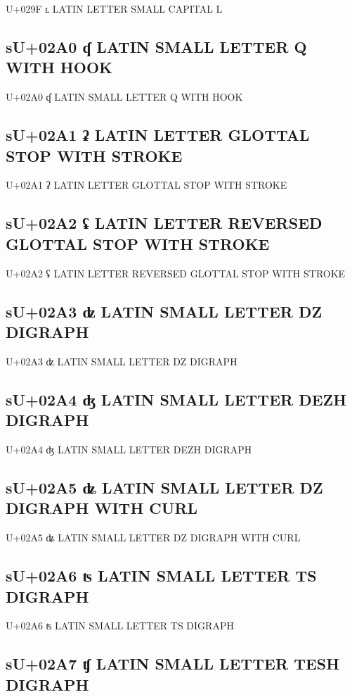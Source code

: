 U+029F ʟ LATIN LETTER SMALL CAPITAL L

\subsection{sU+02A0 ʠ LATIN SMALL LETTER Q WITH HOOK}

U+02A0 ʠ LATIN SMALL LETTER Q WITH HOOK

\subsection{sU+02A1 ʡ LATIN LETTER GLOTTAL STOP WITH STROKE}

U+02A1 ʡ LATIN LETTER GLOTTAL STOP WITH STROKE

\subsection{sU+02A2 ʢ LATIN LETTER REVERSED GLOTTAL STOP WITH STROKE}

U+02A2 ʢ LATIN LETTER REVERSED GLOTTAL STOP WITH STROKE

\subsection{sU+02A3 ʣ LATIN SMALL LETTER DZ DIGRAPH}

U+02A3 ʣ LATIN SMALL LETTER DZ DIGRAPH

\subsection{sU+02A4 ʤ LATIN SMALL LETTER DEZH DIGRAPH}

U+02A4 ʤ LATIN SMALL LETTER DEZH DIGRAPH

\subsection{sU+02A5 ʥ LATIN SMALL LETTER DZ DIGRAPH WITH CURL}

U+02A5 ʥ LATIN SMALL LETTER DZ DIGRAPH WITH CURL

\subsection{sU+02A6 ʦ LATIN SMALL LETTER TS DIGRAPH}

U+02A6 ʦ LATIN SMALL LETTER TS DIGRAPH

\subsection{sU+02A7 ʧ LATIN SMALL LETTER TESH DIGRAPH}


